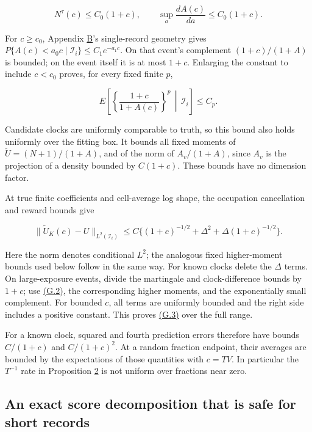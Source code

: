 \documentclass[11pt]{article}
\begin{document}
\begin{equation*}
N^\tau(c)\leq C_0(1+c),\qquad
\sup_a\frac{dA(c)}{da}\leq C_0(1+c).
\tag{G.1}\label{eq:G.1}
\end{equation*}

For \(c\geq c_0\), Appendix \hyperref[sec:B]{B}'s single-record geometry gives
\(P\{A(c)<a_0c\mid\mathcal I_i\}\leq C_1e^{-a_1c}\).
On that event's complement \((1+c)/(1+A)\) is bounded; on the event itself it is at most \(1+c\). Enlarging the constant to include \(c<c_0\) proves, for every fixed finite \(p\),

\begin{equation*}
E\left[\left\{\frac{1+c}{1+A(c)}\right\}^p
 \,\middle|\,\mathcal I_i\right]\leq C_p .
\tag{G.2}\label{eq:G.2}
\end{equation*}

Candidate clocks are uniformly comparable to truth, so this bound also holds uniformly over the fitting box. It bounds all fixed moments of \(\widetilde U=(N+1)/(1+A)\), and of the norm of \(A_v/(1+A)\), since \(A_v\) is the projection of a density bounded by \(C(1+c)\). These bounds have no dimension factor.

At true finite coefficients and cell-average log shape, the occupation cancellation and reward bounds give

\begin{equation*}
\|\widetilde U_K(c)-U\|_{L^2(\mathcal I_i)}
\leq C\{(1+c)^{-1/2}+\Delta^2+\Delta(1+c)^{-1/2}\}.
\tag{G.3}\label{eq:G.3}
\end{equation*}

Here the norm denotes conditional \(L^2\); the analogous fixed higher-moment bounds used below follow in the same way. For known clocks delete the \(\Delta\) terms. On large-exposure events, divide the martingale and clock-difference bounds by \(1+c\); use \hyperref[eq:G.2]{(G.2)}, the corresponding higher moments, and the exponentially small complement. For bounded \(c\), all terms are uniformly bounded and the right side includes a positive constant. This proves \hyperref[eq:G.3]{(G.3)} over the full range.

For a known clock, squared and fourth prediction errors therefore have bounds \(C/(1+c)\) and \(C/(1+c)^2\). At a random fraction endpoint, their averages are bounded by the expectations of those quantities with \(c=TV\). In particular the \(T^{-1}\) rate in Proposition \hyperref[res:Proposition-2]{2} is not uniform over fractions near zero.

\subsection{An exact score decomposition that is safe for short records}\label{sec:G.3}
\end{document}
